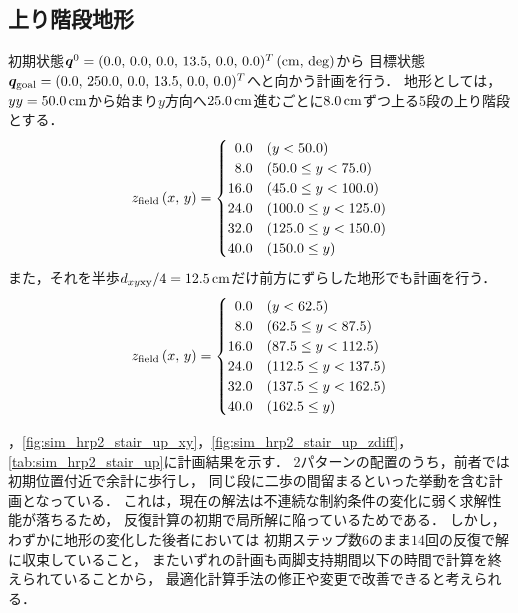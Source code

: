 \documentclass[autodetect-engine,dvipdfmx-if-dvi,ja=standard,a4j,jbase=11pt,magstyle=nomag*]{bxjsreport}
\begin{document}
\subsection{上り階段地形}
初期状態$\bm{q}^0 = ( 0.0 ,\, 0.0 ,\, 0.0 ,\, 13.5 ,\, 0.0 ,\, 0.0 )^T\,(\si{\centi\meter} ,\, \mathrm{deg})$から
目標状態$\bm{q}_{\mathrm{goal}} = ( 0.0 ,\, 250.0 ,\, 0.0 ,\, 13.5 ,\, 0.0 ,\, 0.0 )^T$へと向かう計画を行う．
地形としては，$yy = 50.0\,\si{\centi\meter}$から始まり$y$方向へ$25.0\,\si{\centi\meter}$進むごとに$8.0\,\si{\centi\meter}$ずつ上る5段の上り階段とする．
\begin{equation}
    z_{\mathrm{field}}\left( x ,\, y \right) =
        \begin{cases}
            \phantom{0}0.0  &   \left( y < 50.0 \right) \\
            \phantom{0}8.0  &   \left( 50.0  \leq y  < 75.0 \right) \\
            16.0            &   \left( 45.0  \leq y < 100.0 \right) \\
            24.0            &   \left( 100.0 \leq y < 125.0 \right) \\
            32.0            &   \left( 125.0 \leq y < 150.0 \right) \\
            40.0            &   \left( 150.0 \leq y \right)
        \end{cases}
\end{equation}
また，それを半歩$d_{xy \mathrm{xy}} / 4 = 12.5\,\si{\centi\meter}$だけ前方にずらした地形でも計画を行う．
\begin{equation}
    z_{\mathrm{field}}\left( x ,\, y \right) =
        \begin{cases}
            \phantom{0}0.0  &   \left( y < 62.5 \right) \\
            \phantom{0}8.0  &   \left( 62.5  \leq y  < 87.5 \right) \\
            16.0            &   \left( 87.5  \leq y < 112.5 \right) \\
            24.0            &   \left( 112.5 \leq y < 137.5 \right) \\
            32.0            &   \left( 137.5 \leq y < 162.5 \right) \\
            40.0            &   \left( 162.5 \leq y \right)
        \end{cases}
\end{equation}

，\cref{fig:sim_hrp2_stair_up_xy}，\cref{fig:sim_hrp2_stair_up_zdiff}，
\cref{tab:sim_hrp2_stair_up}に計画結果を示す．
2パターンの配置のうち，前者では初期位置付近で余計に歩行し，
同じ段に二歩の間留まるといった挙動を含む計画となっている．
これは，現在の解法は不連続な制約条件の変化に弱く求解性能が落ちるため，
反復計算の初期で局所解に陥っているためである．
しかし，わずかに地形の変化した後者においては
初期ステップ数$6$のまま$14$回の反復で解に収束していること，
またいずれの計画も両脚支持期間以下の時間で計算を終えられていることから，
最適化計算手法の修正や変更で改善できると考えられる．
\end{document}
